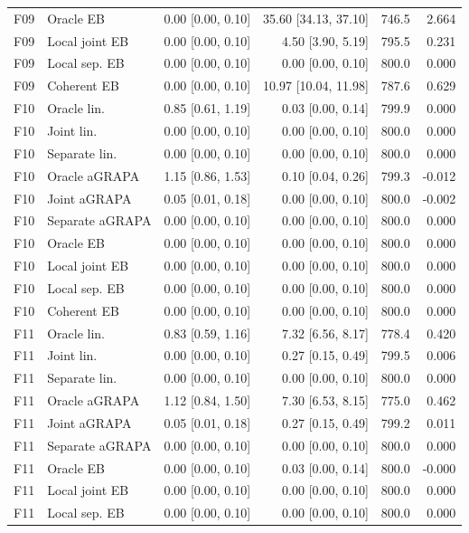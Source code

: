\begin{longtable}{llrrrr}
F09 & Oracle EB & 0.00 [0.00, 0.10] & 35.60 [34.13, 37.10] & 746.5 & 2.664\\
F09 & Local joint EB & 0.00 [0.00, 0.10] & 4.50 [3.90, 5.19] & 795.5 & 0.231\\
F09 & Local sep. EB & 0.00 [0.00, 0.10] & 0.00 [0.00, 0.10] & 800.0 & 0.000\\
F09 & Coherent EB & 0.00 [0.00, 0.10] & 10.97 [10.04, 11.98] & 787.6 & 0.629\\
F10 & Oracle lin. & 0.85 [0.61, 1.19] & 0.03 [0.00, 0.14] & 799.9 & 0.000\\
F10 & Joint lin. & 0.00 [0.00, 0.10] & 0.00 [0.00, 0.10] & 800.0 & 0.000\\
F10 & Separate lin. & 0.00 [0.00, 0.10] & 0.00 [0.00, 0.10] & 800.0 & 0.000\\
F10 & Oracle aGRAPA & 1.15 [0.86, 1.53] & 0.10 [0.04, 0.26] & 799.3 & -0.012\\
F10 & Joint aGRAPA & 0.05 [0.01, 0.18] & 0.00 [0.00, 0.10] & 800.0 & -0.002\\
F10 & Separate aGRAPA & 0.00 [0.00, 0.10] & 0.00 [0.00, 0.10] & 800.0 & 0.000\\
F10 & Oracle EB & 0.00 [0.00, 0.10] & 0.00 [0.00, 0.10] & 800.0 & 0.000\\
F10 & Local joint EB & 0.00 [0.00, 0.10] & 0.00 [0.00, 0.10] & 800.0 & 0.000\\
F10 & Local sep. EB & 0.00 [0.00, 0.10] & 0.00 [0.00, 0.10] & 800.0 & 0.000\\
F10 & Coherent EB & 0.00 [0.00, 0.10] & 0.00 [0.00, 0.10] & 800.0 & 0.000\\
F11 & Oracle lin. & 0.83 [0.59, 1.16] & 7.32 [6.56, 8.17] & 778.4 & 0.420\\
F11 & Joint lin. & 0.00 [0.00, 0.10] & 0.27 [0.15, 0.49] & 799.5 & 0.006\\
F11 & Separate lin. & 0.00 [0.00, 0.10] & 0.00 [0.00, 0.10] & 800.0 & 0.000\\
F11 & Oracle aGRAPA & 1.12 [0.84, 1.50] & 7.30 [6.53, 8.15] & 775.0 & 0.462\\
F11 & Joint aGRAPA & 0.05 [0.01, 0.18] & 0.27 [0.15, 0.49] & 799.2 & 0.011\\
F11 & Separate aGRAPA & 0.00 [0.00, 0.10] & 0.00 [0.00, 0.10] & 800.0 & 0.000\\
F11 & Oracle EB & 0.00 [0.00, 0.10] & 0.03 [0.00, 0.14] & 800.0 & -0.000\\
F11 & Local joint EB & 0.00 [0.00, 0.10] & 0.00 [0.00, 0.10] & 800.0 & 0.000\\
F11 & Local sep. EB & 0.00 [0.00, 0.10] & 0.00 [0.00, 0.10] & 800.0 & 0.000\\

\end{longtable}

